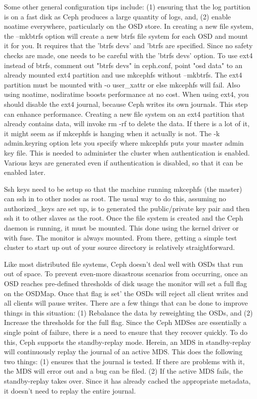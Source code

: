 \documentclass[11pt]{article}
\begin{document}
Some other general configuration tips include: (1) ensuring that the log 
partition is on a fast disk as Ceph produces a large quantity of logs, 
and, (2) enable noatime everywhere, particularly on the OSD store.
In creating a new file system, the --mkbtrfs option will create a new 
btrfs file system for each OSD and mount it for you. It requires that 
the 'btrfs devs' and 'btrfs are specified. Since no safety checks are 
made, one needs to be careful with the 'btrfs devs' option. To use ext4 
instead of btrfs, comment out "btrfs devs" in ceph.conf, point "osd data" 
to an already mounted ext4 partition and use mkcephfs without --mkbtrfs. 
The ext4 partition must be mounted with -o user\_xattr or else mkcephfs 
will fail. Also using noatime, nodiratime boosts performance at no cost. 
When using ext4, you should disable the ext4 journal, because Ceph writes 
its own journals. This step can enhance performance.  Creating a new file 
system on an ext4 partition that already contains data, will invoke rm -rf 
to delete the data. If there is a lot of it, it might seem as if mkcephfs 
is hanging when it actually is not. The -k admin.keyring option lets you 
specify where mkcephfs puts your master admin key file. This is needed to 
administer the cluster when authentication is enabled. Various keys are 
generated even if authentication is disabled, so that it can be enabled 
later. 

Ssh keys need to be setup so that the machine running mkcephfs (the master) 
can ssh in to other nodes as root. The usual way to do this, assuming no 
authorized\_keys are set up, is to generated the public/private key pair and 
then ssh it to other slaves as the root. Once the file system is created and 
the Ceph daemon is running, it must be mounted. This done using the kernel 
driver or with fuse. The monitor is always mounted. From there, getting a 
simple test cluster to start up out of your source directory is relatively 
straightforward.

Like most distributed file systems, Ceph doesn't deal well with OSDs that 
run out of space. To prevent even-more disastrous scenarios from occurring, 
once an OSD reaches pre-defined thresholds of disk usage the monitor will 
set a full flag on the OSDMap. Once that flag is set’ the OSDs will reject  
all client writes and all clients will pause writes. There are a few things 
that can be done to improve things in this situation: (1) Rebalance the data 
by reweighting the OSDs, and (2) Increase the thresholds for the full flag.
Since the Ceph MDSes are essentially a single point of failure, there is a 
need to ensure that they recover quickly. To do this, Ceph supports the 
standby-replay mode. Herein, an MDS in standby-replay will continuously 
replay the journal of an active MDS. This does the following two things: 
(1) ensures that the journal is tested. If there are problems with it, the 
MDS will error out and a bug can be filed. (2) If the active MDS fails, the 
standby-replay takes over. Since it has already cached the appropriate 
metadata, it doesn't need to replay the entire journal.
\end{document}
